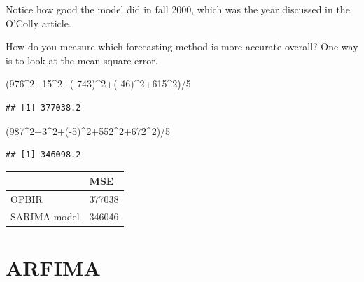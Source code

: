 \documentclass[
]{book}
\newenvironment{Shaded}{\begin{snugshade}}{\end{snugshade}}
\newcommand{\DecValTok}[1]{\textcolor[rgb]{0.00,0.00,0.81}{#1}}
\newcommand{\NormalTok}[1]{#1}
\newcommand{\SpecialCharTok}[1]{\textcolor[rgb]{0.00,0.00,0.00}{#1}}
\theoremstyle{definition}
\theoremstyle{definition}
\theoremstyle{definition}
\theoremstyle{definition}
\theoremstyle{remark}
\begin{document}
Notice how good the model did in fall 2000, which was the year discussed in the O'Colly article.

How do you measure which forecasting method is more accurate overall? One way is to look at the mean square error.

\begin{Shaded}
\begin{Highlighting}[]
\NormalTok{(}\DecValTok{976}\SpecialCharTok{\^{}}\DecValTok{2}\SpecialCharTok{+}\DecValTok{15}\SpecialCharTok{\^{}}\DecValTok{2}\SpecialCharTok{+}\NormalTok{(}\SpecialCharTok{{-}}\DecValTok{743}\NormalTok{)}\SpecialCharTok{\^{}}\DecValTok{2}\SpecialCharTok{+}\NormalTok{(}\SpecialCharTok{{-}}\DecValTok{46}\NormalTok{)}\SpecialCharTok{\^{}}\DecValTok{2}\SpecialCharTok{+}\DecValTok{615}\SpecialCharTok{\^{}}\DecValTok{2}\NormalTok{)}\SpecialCharTok{/}\DecValTok{5}
\end{Highlighting}
\end{Shaded}

\begin{verbatim}
## [1] 377038.2
\end{verbatim}

\begin{Shaded}
\begin{Highlighting}[]
\NormalTok{(}\DecValTok{987}\SpecialCharTok{\^{}}\DecValTok{2}\SpecialCharTok{+}\DecValTok{3}\SpecialCharTok{\^{}}\DecValTok{2}\SpecialCharTok{+}\NormalTok{(}\SpecialCharTok{{-}}\DecValTok{5}\NormalTok{)}\SpecialCharTok{\^{}}\DecValTok{2}\SpecialCharTok{+}\DecValTok{552}\SpecialCharTok{\^{}}\DecValTok{2}\SpecialCharTok{+}\DecValTok{672}\SpecialCharTok{\^{}}\DecValTok{2}\NormalTok{)}\SpecialCharTok{/}\DecValTok{5}
\end{Highlighting}
\end{Shaded}

\begin{verbatim}
## [1] 346098.2
\end{verbatim}

\begin{longtable}[]{@{}ll@{}}
\toprule()
& MSE \\
\midrule()
\endhead
OPBIR & 377038 \\
SARIMA model & 346046 \\
\bottomrule()
\end{longtable}

\hypertarget{arfima}{%
\chapter{ARFIMA}\label{arfima}}
\end{document}
